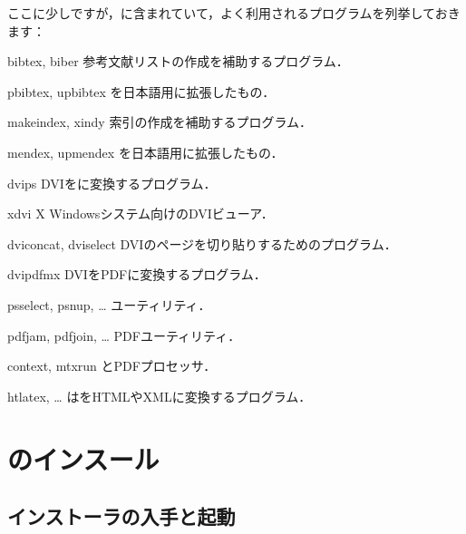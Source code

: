 \documentclass[uplatex,dvipdfmx,tombow]{jsarticle}
\begin{document}
ここに少しですが，\TL に含まれていて，よく利用されるプログラムを列挙しておきます：
%
\begin{cmddescription}
\item[bibtex, biber]
参考文献リストの作成を補助するプログラム．

\item[pbibtex, upbibtex]
を日本語用に拡張したもの．

\item[makeindex, xindy]
索引の作成を補助するプログラム．

\item[mendex, upmendex]
を日本語用に拡張したもの．

\item[dvips]
DVIを\PS に変換するプログラム．

\item[xdvi]
X Windowsシステム向けのDVIビューア．

\item[dviconcat, dviselect]
DVIのページを切り貼りするためのプログラム．

\item[dvipdfmx]
DVIをPDFに変換するプログラム．

\item[psselect, psnup, \ldots]
\PS ユーティリティ．

\item[pdfjam, pdfjoin, \ldots]
PDFユーティリティ．

\item[context, mtxrun]
\ConTeXt とPDFプロセッサ．

\item[htlatex, \ldots]
は\AllTeX をHTMLやXMLに変換するプログラム．
\end{cmddescription}

\section{\TL のインスール}
\label{sec:install}

\subsection{インストーラの入手と起動}
\label{sec:inst-start}
\end{document}

